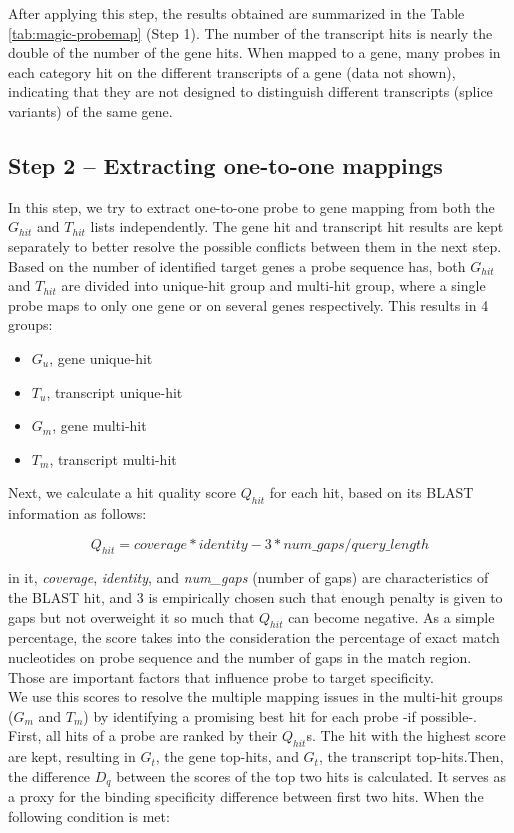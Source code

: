 After applying this step, the results obtained are summarized in the Table \ref{tab:magic-probemap} (Step 1). The number of the transcript hits is nearly the double of the number of the gene hits. When mapped to a gene, many probes in each category hit on the different transcripts of a gene (data not shown), indicating that they are not designed to distinguish different transcripts (splice variants) of the same gene.

\subsection{Step 2 – Extracting one-to-one mappings}

In this step, we try to extract one-to-one probe to gene mapping from both the $G_{hit}$ and $T_{hit}$ lists independently. The gene hit and transcript hit results are kept separately to better resolve the possible conflicts between them in the next step. Based on the number of identified target genes a probe sequence has, both $G_{hit}$ and $T_{hit}$ are divided into unique-hit group and multi-hit group, where a single probe maps to only one gene or on several genes respectively. This results in 4 groups: 

\begin{itemize}
\item $G_u$, gene unique-hit
\item $T_u$, transcript unique-hit
\item $G_m$, gene multi-hit
\item $T_m$, transcript multi-hit
\end{itemize}

Next, we calculate a hit quality score $Q_{hit}$ for each hit, based on its BLAST information as follows:  

\begin{equation}
Q_{hit} = coverage * identity - 3 * num\_gaps / query\_length
\end{equation}

in it, \textit{coverage},  \textit{identity}, and \textit{num\_gaps} (number of gaps) are characteristics of the BLAST hit, and $3$ is empirically chosen such that enough penalty is given to gaps but not overweight it so much that $Q_{hit}$ can become negative. As a simple percentage, the score takes into the consideration the percentage of exact match nucleotides on probe sequence and the number of gaps in the match region. Those are important factors that influence probe to target specificity.  \\
We use this scores to resolve the multiple mapping issues in the multi-hit groups ($G_m$ and $T_m$) by identifying a promising best hit for each probe -if possible-. First, all hits of a probe are ranked by their $Q_{hit}$s. The hit with the highest score are kept, resulting in $G_t$, the gene top-hits, and $G_t$, the transcript top-hits.Then, the difference $D_q$ between the scores of the top two hits is calculated. It serves as a proxy for the binding specificity difference between first two hits. When the following condition is met: 


